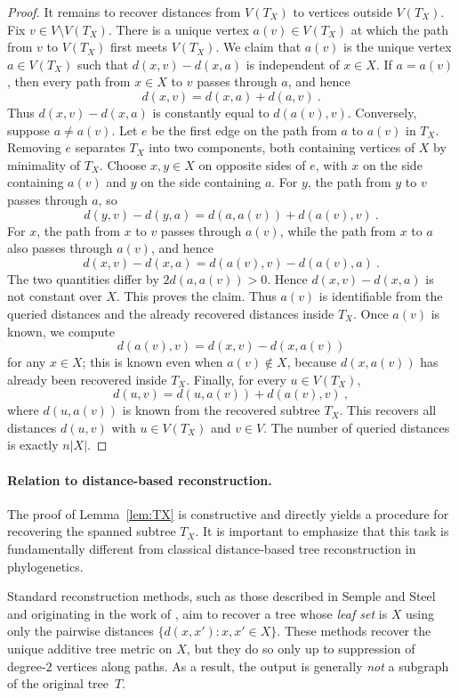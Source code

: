\documentclass[12pt]{article}
\begin{document}
\begin{proof}
It remains to recover distances from $V(T_X)$ to vertices outside $V(T_X)$. Fix $v\in V\setminus V(T_X)$. There is a unique vertex $a(v)\in V(T_X)$ at which the path from $v$ to $V(T_X)$ first meets $V(T_X)$. We claim that $a(v)$ is the unique vertex $a\in V(T_X)$ such that $d(x,v)-d(x,a)$ is independent of $x\in X$. If $a=a(v)$, then every path from $x\in X$ to $v$ passes through $a$, and hence
$$
d(x,v)=d(x,a)+d(a,v)~.
$$
Thus $d(x,v)-d(x,a)$ is constantly equal to $d(a(v),v)$. Conversely, suppose $a\neq a(v)$. Let $e$ be the first edge on the path from $a$ to $a(v)$ in $T_X$. Removing $e$ separates $T_X$ into two components, both containing vertices of $X$ by minimality of $T_X$. Choose $x,y\in X$ on opposite sides of $e$, with $x$ on the side containing $a(v)$ and $y$ on the side containing $a$. For $y$, the path from $y$ to $v$ passes through $a$, so
$$
d(y,v)-d(y,a)=d(a,a(v))+d(a(v),v)~.
$$
For $x$, the path from $x$ to $v$ passes through $a(v)$, while the path from $x$ to $a$ also passes through $a(v)$, and hence
$$
d(x,v)-d(x,a)=d(a(v),v)-d(a(v),a)~.
$$
The two quantities differ by $2d(a,a(v))>0$. Hence $d(x,v)-d(x,a)$ is not constant over $X$. This proves the claim. Thus $a(v)$ is identifiable from the queried distances and the already recovered distances inside $T_X$. Once $a(v)$ is known, we compute
$$
d(a(v),v)=d(x,v)-d(x,a(v))
$$
for any $x\in X$; this is known even when $a(v)\notin X$, because $d(x,a(v))$ has already been recovered inside $T_X$. Finally, for every $u\in V(T_X)$,
$$
d(u,v)=d(u,a(v))+d(a(v),v)~,
$$
where $d(u,a(v))$ is known from the recovered subtree $T_X$. This recovers all distances $d(u,v)$ with $u\in V(T_X)$ and $v\in V$. The number of queried distances is exactly $n|X|$.
 \end{proof}
\paragraph{Relation to distance-based reconstruction.}
The proof of Lemma~\ref{lem:TX} is constructive and directly yields a procedure for recovering the spanned subtree $T_X$.
It is important to emphasize that this task is fundamentally different from classical distance-based tree reconstruction in phylogenetics.

Standard reconstruction methods, such as those described in Semple and Steel 
\citep[Section~7.3]{semple2003phylogenetics} and originating in the work of
\citet{buneman1971recovery}, aim to recover a tree whose \emph{leaf set} is $X$
using only the pairwise distances $\{d(x,x') : x,x'\in X\}$.
These methods recover the unique additive tree metric on $X$, but they do so
only up to suppression of degree-$2$ vertices along paths.
As a result, the output is generally \emph{not} a subgraph of the original tree~$T$.
\end{document}
